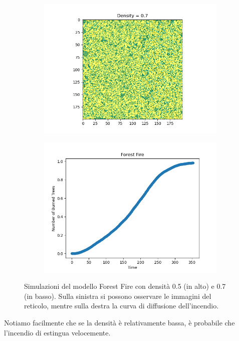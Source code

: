 \documentclass{article}
\begin{document}
\begin{figure}[H]
\begin{subfigure}[b]{0.49\linewidth}
         \includegraphics[width=\linewidth]{../images/forestfire_single07image}
     \end{subfigure}
        \hfill
        \begin{subfigure}[b]{0.49\linewidth}
         \centering
         \includegraphics[width=\linewidth]{../images/forestfire_single07}
     \end{subfigure}
     \caption{Simulazioni del modello Forest Fire con densità 0.5 (in alto) e 0.7 (in basso). Sulla sinistra si possono
     osservare le immagini del reticolo, mentre sulla destra la curva di diffusione dell'incendio.}
     \label{fig:forestfire}
    \end{figure}
    Notiamo facilmente che se la densità è relativamente bassa, è probabile che l'incendio di estingua velocemente.
\end{document}
